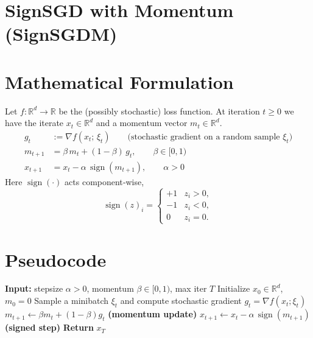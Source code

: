 \documentclass{article}
\begin{document}
\section*{SignSGD with Momentum (SignSGDM)}

\section*{Mathematical Formulation}
Let $f:\mathbb{R}^{d}\rightarrow\mathbb{R}$ be the (possibly stochastic) loss function.  
At iteration $t\ge 0$ we have the iterate $x_t\in\mathbb{R}^{d}$ and a momentum vector $m_t\in\mathbb{R}^{d}$.
\[
\begin{aligned}
g_t &:= \nabla f(x_t;\,\xi_t) \qquad\text{(stochastic gradient on a random sample }\xi_t\text{)}\\[4pt]
m_{t+1} &= \beta\,m_{t}+ (1-\beta)\,g_t ,\qquad\beta\in[0,1) \tag{1}\\[4pt]
x_{t+1} &= x_t - \alpha \,\operatorname{sign}(m_{t+1}), \qquad\alpha>0 \tag{2}
\end{aligned}
\]
Here $\operatorname{sign}(\cdot)$ acts component‑wise,
\[
\operatorname{sign}(z)_i = \begin{cases}
+1 & z_i>0,\\
-1 & z_i<0,\\
0  & z_i=0 .
\end{cases}
\]

\section*{Pseudocode}
\begin{algorithm}[H]
\caption{SignSGD with Momentum}
\label{alg:signsgdm}
\begin{algorithmic}[1]
\STATE \textbf{Input:} stepsize $\alpha>0$, momentum $\beta\in[0,1)$, max iter $T$
\STATE Initialize $x_0\in\mathbb{R}^{d}$, $m_0=0$
    \STATE Sample a minibatch $\xi_t$ and compute stochastic gradient $g_t=\nabla f(x_t;\xi_t)$
    \STATE $m_{t+1}\gets \beta m_{t}+(1-\beta)g_t$ \hfill\textbf{(momentum update)} \label{line:momentum}
    \STATE $x_{t+1}\gets x_t-\alpha\,\operatorname{sign}(m_{t+1})$ \hfill\textbf{(signed step)} \label{line:update}
\ENDFOR
\STATE \textbf{Return} $x_T$
\end{algorithmic}
\end{algorithm}
\end{document}
